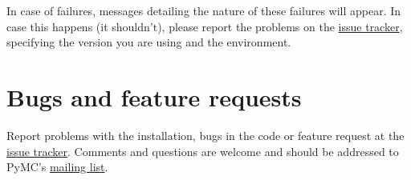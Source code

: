 In case of failures, messages detailing the nature of these failures will
appear. In case this happens (it shouldn't), please report
the problems on the \href{http://code.google.com/p/pymc/issues/list.}{issue tracker}, specifying the version you are using and
the environment.



\hypertarget{bugs-and-feature-requests}{}
\section*{Bugs and feature requests}
\label{bugs-and-feature-requests}

Report problems with the installation, bugs in the code or feature request at
the \href{http://code.google.com/p/pymc/issues/list.}{issue tracker}. Comments and questions are welcome and should be
addressed to PyMC's \href{mailto:pymc-users@fisher.forestry.uga.edu}{mailing list}.


